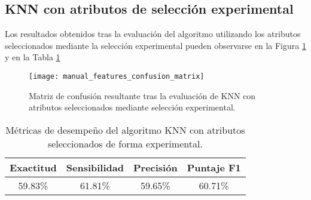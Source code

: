 \newpage
\subsection{KNN con atributos de selección experimental}
Los resultados obtenidos tras la evaluación del algoritmo utilizando los atributos seleccionados mediante la selección experimental pueden observarse en la Figura \ref{Fig: ExpCM} y en la Tabla \ref{Tab: ResExp}

\begin{figure}[htbp]
	\centering
	\texttt{[image: manual\_features\_confusion\_matrix]}
	\caption{Matriz de confusión resultante tras la evaluación de KNN con atributos seleccionados mediante selección experimental.}
	\label{Fig: ExpCM}
\end{figure}

\begin{table}[htbp]
	\centering
	\caption{Métricas de desempeño del algoritmo KNN con atributos seleccionados de forma experimental.}
	\begin{tabular}{cccc}
		\hline\hline
		Exactitud    & Sensibilidad   & Precisión & Puntaje F1    \\ 
		\hline\hline
		59.83\% & 61.81\% & 59.65\% & 60.71\% \\
		\hline\hline
	\end{tabular}
	\label{Tab: ResExp}
\end{table}

